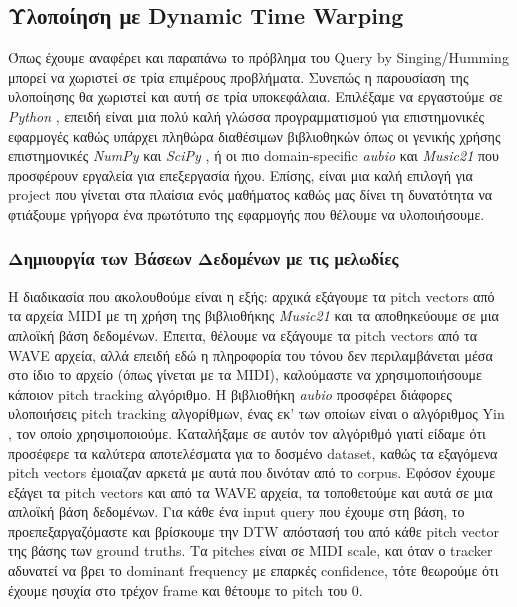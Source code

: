 \subsection{Υλοποίηση με Dynamic Time Warping}
Όπως έχουμε αναφέρει και παραπάνω το πρόβλημα του Query by Singing/Humming μπορεί να χωριστεί σε 
τρία επιμέρους προβλήματα. Συνεπώς η παρουσίαση της υλοποίησης θα χωριστεί και αυτή σε τρία υποκεφάλαια.
Επιλέξαμε να εργαστούμε σε \emph{Python} \cite{python}, επειδή είναι μια πολύ καλή γλώσσα προγραμματισμού για επιστημονικές εφαρμογές καθώς υπάρχει πληθώρα διαθέσιμων βιβλιοθηκών όπως οι γενικής χρήσης επιστημονικές
\emph{NumPy} \cite{numpy} και \emph{SciPy} \cite{scipy}, ή οι πιο domain-specific \emph{aubio} \cite{aubio} και \emph{Music21}
\cite{music21} που προσφέρουν εργαλεία για επεξεργασία ήχου. Επίσης, είναι μια καλή επιλογή για project που γίνεται στα πλαίσια ενός μαθήματος καθώς μας δίνει τη δυνατότητα να φτιάξουμε γρήγορα ένα πρωτότυπο της εφαρμογής που θέλουμε να υλοποιήσουμε.

\subsubsection{Δημιουργία των Βάσεων Δεδομένων με τις μελωδίες}
Η διαδικασία που ακολουθούμε είναι η εξής: αρχικά εξάγουμε τα pitch vectors από τα αρχεία MIDI με τη χρήση της βιβλιοθήκης \emph{Music21}
\cite{music21} και τα αποθηκεύουμε σε μια απλοϊκή βάση δεδομένων. Έπειτα, θέλουμε να εξάγουμε τα pitch vectors από τα WAVE αρχεία, αλλά επειδή εδώ η
πληροφορία του τόνου δεν περιλαμβάνεται μέσα στο ίδιο το αρχείο (όπως γίνεται με τα MIDI), καλούμαστε να χρησιμοποιήσουμε κάποιον pitch
tracking αλγόριθμο. Η βιβλιοθήκη \emph{aubio} \cite{aubio} προσφέρει διάφορες υλοποιήσεις pitch tracking αλγορίθμων, ένας εκ' των οποίων
είναι ο αλγόριθμος Yin \cite{de2002yin}, τον οποίο χρησιμοποιούμε. Καταλήξαμε σε αυτόν τον αλγόριθμό γιατί είδαμε ότι προσέφερε τα καλύτερα
αποτελέσματα για το δοσμένο dataset, καθώς τα εξαγόμενα pitch vectors έμοιαζαν αρκετά με αυτά που δινόταν από το corpus. Εφόσον έχουμε εξάγει τα pitch vectors
και από τα WAVE αρχεία, τα τοποθετούμε και αυτά σε μια απλοϊκή βάση δεδομένων. Για κάθε ένα input query που έχουμε στη βάση, το
προεπεξαργαζόμαστε και βρίσκουμε την DTW απόστασή του από κάθε pitch vector της βάσης των ground truths. Τα pitches είναι σε MIDI scale, και όταν
ο tracker αδυνατεί να βρει το dominant frequency με επαρκές confidence, τότε θεωρούμε ότι έχουμε ησυχία στο τρέχον frame και θέτουμε το
pitch του 0.

